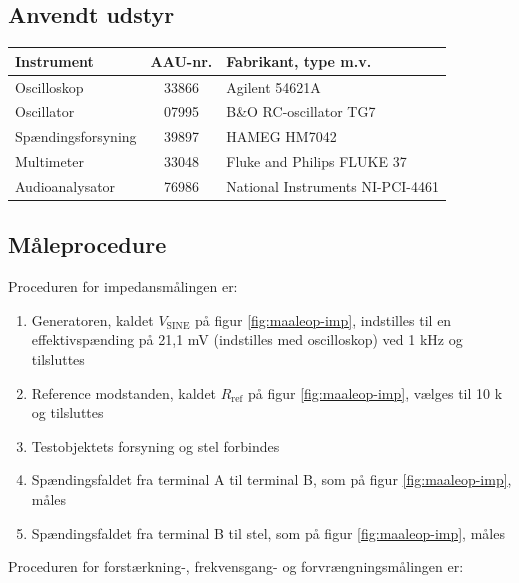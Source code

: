 \subsection*{Anvendt udstyr}

\begin{table}[h]
\centering
\begin{tabular}{l|c|l}
\hline\hline
Instrument & AAU-nr. & Fabrikant, type m.v. \\
\hline\hline
Oscilloskop & 33866 & Agilent 54621A \\[4pt]
Oscillator & 07995 & B\&O RC-oscillator TG7 \\[4pt]
Spændingsforsyning & 39897 & HAMEG HM7042 \\[4pt]
Multimeter & 33048 & Fluke and Philips FLUKE 37 \\[4pt]
Audioanalysator & 76986 & National Instruments NI-PCI-4461 \\
\hline\hline
\end{tabular}
\label{tab:maaleudstyr_forforstaerker}
\end{table}

\subsection*{Måleprocedure}
Proceduren for impedansmålingen er:

\begin{enumerate}
\item Generatoren, kaldet $V_\mathrm{SINE}$ på figur \ref{fig:maaleop-imp}, indstilles til en effektivspænding på 21,1 mV (indstilles med oscilloskop) ved 1 kHz og tilsluttes
\item Reference modstanden, kaldet $R_\mathrm{ref}$ på figur \ref{fig:maaleop-imp}, vælges til 10 k\ohm~ og tilsluttes
\item Testobjektets forsyning og stel forbindes
\item Spændingsfaldet fra terminal A til terminal B, som på figur \ref{fig:maaleop-imp}, måles
\item Spændingsfaldet fra terminal B til stel, som på figur \ref{fig:maaleop-imp}, måles
\end{enumerate}

Proceduren for forstærkning-, frekvensgang- og forvrængningsmålingen er:

